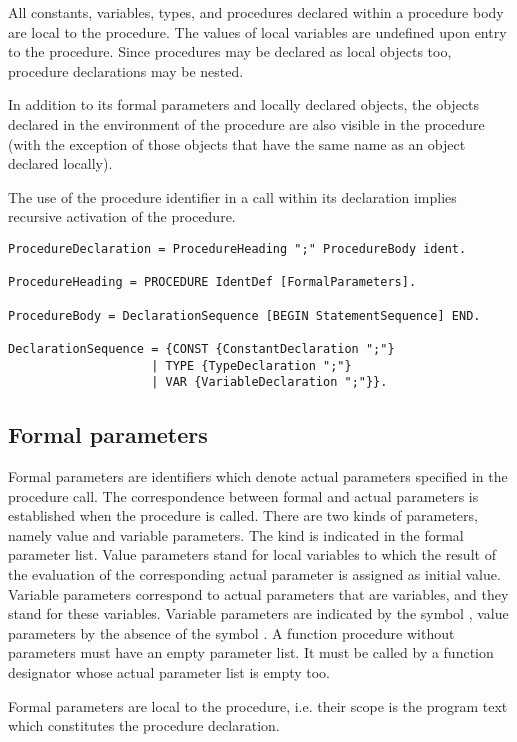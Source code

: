 \documentclass[12pt]{article}
\begin{document}
All constants, variables, types, and procedures declared within a procedure body are local to the procedure. The values of local variables are undefined upon entry to the procedure. Since procedures may be declared as local objects too, procedure declarations may be nested.

In addition to its formal parameters and locally declared objects, the objects declared in the environment of the procedure are also visible in the procedure (with the exception of those objects that have the same name as an object declared locally).

The use of the procedure identifier in a call within its declaration implies recursive activation of the procedure.

\begin{lstlisting}[style=ebnf]
ProcedureDeclaration = ProcedureHeading ";" ProcedureBody ident. 

ProcedureHeading = PROCEDURE IdentDef [FormalParameters]. 

ProcedureBody = DeclarationSequence [BEGIN StatementSequence] END. 

DeclarationSequence = {CONST {ConstantDeclaration ";"} 
                    | TYPE {TypeDeclaration ";"} 
                    | VAR {VariableDeclaration ";"}}.
\end{lstlisting} 

\subsection{Formal parameters}
\label{parameters}

Formal parameters are identifiers which denote actual parameters specified in the procedure call. The correspondence between formal and actual parameters is established when the procedure is called. There are two kinds of parameters, namely value and variable parameters. The kind is indicated in the formal parameter list. Value parameters stand for local variables to which the result of the evaluation of the corresponding actual parameter is assigned as initial value. Variable parameters correspond to actual parameters that are variables, and they stand for these variables. Variable parameters are indicated by the symbol \VAR, value parameters by the absence of the symbol \VAR. A function procedure without parameters must have an empty parameter list. It must be called by a function designator whose actual parameter list is empty too.

Formal parameters are local to the procedure, i.e. their scope is the program text which constitutes the procedure declaration.
\end{document}
